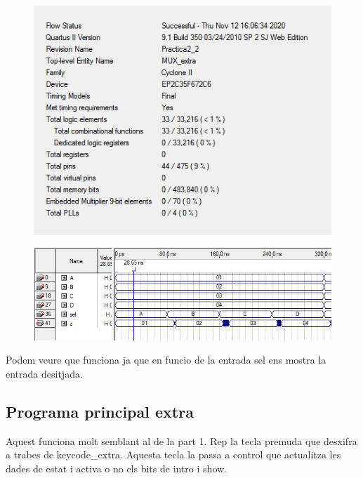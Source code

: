 \documentclass[12pt, a4papre]{article}
\begin{document}
\begin{figure}[H]
		\begin{center}
		\includegraphics[width=130mm]{informeMUXextra.jpeg}
		\end{center}
	\end{figure}

	\begin{figure}[H]
		\begin{center}
		\includegraphics[width=130mm]{SimMUX.jpeg}
		\end{center}
	\end{figure}
	
	Podem veure que funciona ja que en funcio de la entrada sel ens mostra la entrada desitjada.
	
	\subsection{Programa principal extra}
	
	Aquest funciona molt semblant al de la part 1. Rep la tecla premuda que desxifra a trabes de keycode\_extra. Aquesta tecla la passa a control que actualitza les dades de estat i activa o no els bits de intro i show. 
	
\end{document}
